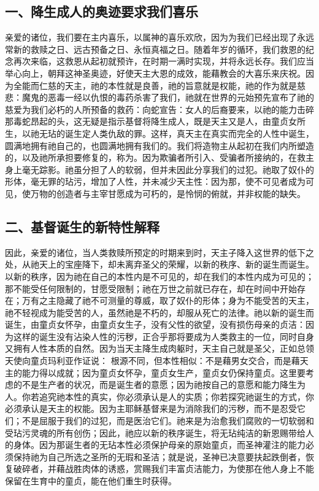 \subsection{一、降生成人的奥迹要求我们喜乐}

亲爱的诸位，我们要在主内喜乐，以属神的喜乐欢欣，因为为我们已经出现了永远常新的救赎之日、远古预备之日、永恒真福之日。随着年岁的循环，我们救恩的纪念再次来临，这救恩从起初就预许，在时期一满时实现，并将永远长存。我们应当举心向上，朝拜这神圣奥迹，好使天主大恩的成效，能藉教会的大喜乐来庆祝。因为全能而仁慈的天主，祂的本性就是良善，祂的旨意就是权能，祂的作为就是慈悲：魔鬼的恶毒一经以仇恨的毒药杀害了我们，祂就在世界的元始预先宣布了祂的慈爱为我们必朽的人所预备的救药：向蛇宣告：女人的后裔要来，以祂的能力击碎那毒蛇昂起的头，这无疑是指示基督将降生成人，既是天主又是人，由童贞女所生，以祂无玷的诞生定人类仇敌的罪。这样，真天主在真实而完全的人性中诞生，圆满地拥有祂自己的，也圆满地拥有我们的。我们将造物主从起初在我们内所塑造的，以及祂所承担要修复的，称为。因为欺骗者所引入、受骗者所接纳的，在救主身上毫无踪影。祂虽分担了人的软弱，但并未因此分享我们的过犯。祂取了奴仆的形体，毫无罪的玷污，增加了人性，并未减少天主性：因为那，使不可见者成为可见，使万物的创造者与主宰甘愿成为可朽的，是怜悯的俯就，并非权能的缺失。\par


\subsection{二、基督诞生的新特性解释}

因此，亲爱的诸位，当人类救赎所预定的时期来到时，天主子降入这世界的低下之处，从祂天上的宝座降下，却未离弃圣父的荣耀，以新的秩序、新的诞生而诞生。以新的秩序，因为祂在自己的本性内是不可见的，却在我们的本性内成为可见的；那不能受任何限制的，甘愿受限制；祂在万世之前就已存在，却在时间中开始存在；万有之主隐藏了祂不可测量的尊威，取了奴仆的形体；身为不能受苦的天主，祂不轻视成为能受苦的人，虽然祂是不朽的，却服从死亡的法律。祂以新的诞生而诞生，由童贞女怀孕，由童贞女生子，没有父性的欲望，没有损伤母亲的贞洁：因为这样的诞生没有沾染人性的污秽，正合乎那将要成为人类救主的一位，同时自身又拥有人性本质的自然。因为当天主降生成肉躯时，天主自己就是圣父，正如总领天使向童贞玛利亚作证说： 根源不同，但本性相似：不是藉男女交合，而是藉天主的能力得以成就；因为童贞女怀孕，童贞女生产，童贞女仍保持童贞。这里要考虑的不是生产者的状况，而是诞生者的意愿；因为祂按自己的意愿和能力降生为人。你若追究祂本性的真实，你必须承认是人的实质；你若探究祂诞生的方式，你必须承认是天主的权能。因为主耶稣基督来是为消除我们的污秽，而不是忍受它们；不是屈服于我们的过犯，而是医治它们。祂来是为治愈我们腐败的一切软弱和受玷污灵魂的所有创伤；因此，祂应以新的秩序诞生，将无玷纯洁的新恩赐带给人的身体。因为那诞生者的无玷本性必须保护母亲的原始童贞，而圣神灌注的能力必须保持祂为自己所选之圣所的无瑕和圣洁；就是说，圣神已决意要扶起跌倒者，恢复破碎者，并藉战胜肉体的诱惑，赏赐我们丰富贞洁能力，为使那在他人身上不能保留在生育中的童贞，能在他们重生时获得。\par

